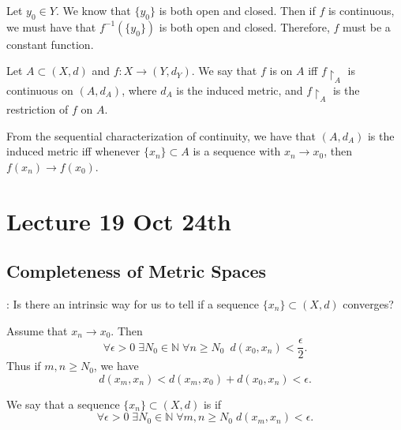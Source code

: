 \documentclass[notoc,notitlepage]{tufte-book}
\begin{document}
Let $y_0 \in Y$. We know that $\{ y_0 \}$ is both open and closed. Then if $f$ is continuous, we must have that $f^{-1}( \{ y_0 \} )$ is both open and closed. Therefore, $f$ must be a constant function.

\begin{defn}\label{defn:continuity_on_a_set}
  Let $A \subset (X, d)$ and $f : X \to (Y, d_Y)$. We say that $f$ is  on $A$ iff $f \restriction_A$ is continuous on $(A, d_A)$, where $d_A$ is the induced metric, and $f \restriction_A$ is the restriction of $f$ on $A$.
\end{defn}

\begin{remark}
  From the sequential characterization of continuity, we have that $(A, d_A)$ is the induced metric iff whenever $\{ x_n \} \subset A$ is a sequence with $x_n \to x_0$, then $f(x_n) \to f(x_0)$.
\end{remark}



\chapter{Lecture 19 Oct 24th}%
\label{chp:lecture_19_oct_24th}

\section{Completeness of Metric Spaces}%
\label{sec:completeness_of_metric_spaces}

: Is there an intrinsic way for us to tell if a sequence $\{ x_n \} \subset (X, d)$ converges?

 Assume that $x_n \to x_0$. Then
\begin{equation*}
  \forall \epsilon > 0 \; \exists N_0 \in \mathbb{N} \; \forall n \geq N_0 \enspace d(x_0, x_n) < \frac{\epsilon}{2}.
\end{equation*}
Thus if $m, n \geq N_0$, we have
\begin{equation*}
  d(x_m, x_n) < d(x_m, x_0) + d(x_0, x_n) < \epsilon.
\end{equation*}

\begin{defn}[Cauchy]\label{defn:cauchy}
  We say that a sequence $\{ x_n \} \subset (X, d)$ is  if
  \begin{equation*}
    \forall \epsilon > 0 \; \exists N_0 \in \mathbb{N} \; \forall m, n \geq N_0 \; d(x_m, x_n) < \epsilon.
  \end{equation*}
\end{defn}
\end{document}
